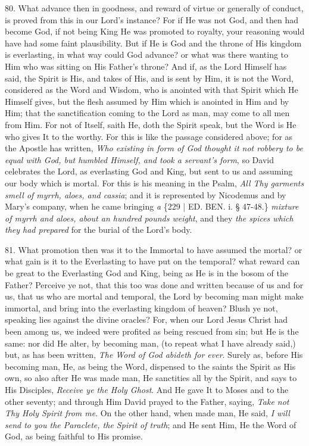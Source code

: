 80. What advance then in
goodness, and reward of virtue or generally of conduct, is proved from
this in our Lord's instance? For if He was not God, and then had
become God, if not being King He was promoted to royalty, your
reasoning would have had some faint plausibility. But if He is God and
the throne of His kingdom is everlasting, in what way could God
advance? or what was there wanting to Him who was sitting on His
Father's throne? And if, as the Lord Himself has said, the Spirit is
His, and takes of His, and is sent by Him, it is not the Word,
considered as the Word and Wisdom, who is anointed with that Spirit
which He Himself gives, but the flesh assumed by Him which is anointed
in Him and by Him; that the sanctification coming to the Lord as man,
may come to all men from Him. For not of Itself, saith He, doth the
Spirit speak, but the Word is He who gives It to the worthy. For this
is like the passage considered above; for as the Apostle has written, \emph{Who
existing in form of God thought it not robbery to be equal with God,
but humbled Himself, and took a servant's form}, so David
celebrates the Lord, as everlasting God and King, but sent to us and
assuming our body which is mortal. For this is his meaning in the
Psalm, \emph{All Thy garments smell of myrrh, aloes, and cassia}; and
it is represented by Nicodemus and by Mary's company, when he came
bringing \emph{a} \{229 | ED.
BEN. i. § 47-48.\} \emph{mixture of myrrh and
aloes, about an hundred pounds weight}, and they \emph{the spices
which they had prepared} for the burial of the Lord's body.

81. What promotion then was it
to the Immortal to have assumed the mortal? or what gain is it to the
Everlasting to have put on the temporal? what reward can be great to
the Everlasting God and King, being as He is in the bosom of the
Father? Perceive ye not, that this too was done and written because of
us and for us, that us who are mortal and temporal, the Lord by
becoming man might make immortal, and bring into the everlasting
kingdom of heaven? Blush ye not, speaking lies against the divine
oracles? For, when our Lord Jesus Christ had been among us, we indeed
were profited as being rescued from sin; but He is the same: nor did
He alter, by becoming man, (to repeat what I have already said,) but,
as has been written, \emph{The Word of God abideth for ever}. Surely
as, before His becoming man, He, as being the Word, dispensed to the
saints the Spirit as His own, so also after He was made man, He
sanctities all by the Spirit, and says to His Disciples, \emph{Receive ye
the Holy Ghost}. And He gave It to Moses and to the other seventy;
and through Him David prayed to the Father, saying, \emph{Take not Thy
Holy Spirit from me}. On the other hand, when made man, He said, \emph{I
will send to you the Paraclete, the Spirit of truth}; and He sent
Him, He the Word of God, as being faithful to His promise.

